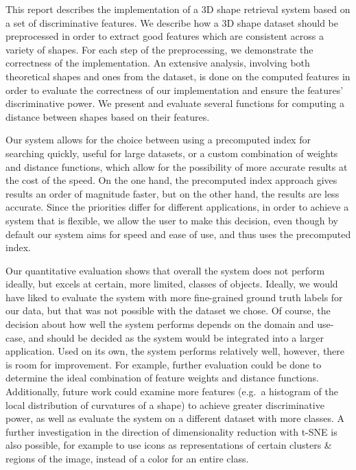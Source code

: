 This report describes the implementation of a 3D shape retrieval system based on a set of discriminative features.
We describe how a 3D shape dataset should be preprocessed in order to extract good features which are consistent across a variety of shapes.
For each step of the preprocessing, we demonstrate the correctness of the implementation.
An extensive analysis, involving both theoretical shapes and ones from the dataset, is done on the computed features in order to evaluate the correctness of our implementation and ensure the features' discriminative power.
We present and evaluate several functions for computing a distance between shapes based on their features.

Our system allows for the choice between using a precomputed index for searching quickly, useful for large datasets, or a custom combination of weights and distance functions, which allow for the possibility of more accurate results at the cost of the speed.
On the one hand, the precomputed index approach gives results an order of magnitude faster, but on the other hand, the results are less accurate.
Since the priorities differ for different applications, in order to achieve a system that is flexible, we allow the user to make this decision, even though by default our system aims for speed and ease of use, and thus uses the precomputed index.

Our quantitative evaluation shows that overall the system does not perform ideally, but excels at certain, more limited, classes of objects.
Ideally, we would have liked to evaluate the system with more fine-grained ground truth labels for our data, but that was not possible with the dataset we chose.
Of course, the decision about how well the system performs depends on the domain and use-case, and should be decided as the system would be integrated into a larger application.
Used on its own, the system performs relatively well, however, there is room for improvement.
For example, further evaluation could be done to determine the ideal combination of feature weights and distance functions.
Additionally, future work could examine more features (e.g.\ a histogram of the local distribution of curvatures of a shape) to achieve greater discriminative power, as well as evaluate the system on a different dataset with more classes.
A further investigation in the direction of dimensionality reduction with t-SNE is also possible, for example to use icons as representations of certain clusters \& regions of the image, instead of a color for an entire class.